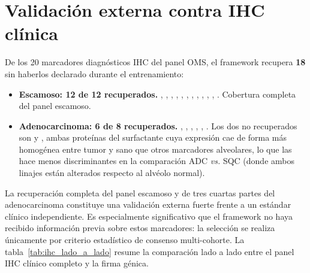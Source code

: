 \section{Validación externa contra IHC clínica}
\label{sec:res_ihc}

De los 20 marcadores diagnósticos IHC del panel OMS, el framework
recupera \textbf{18} sin haberlos declarado durante el entrenamiento:

\begin{itemize}
  \item \textbf{Escamoso: 12 de 12 recuperados.} , ,
  , , , , ,
  , , , , .
  Cobertura completa del panel escamoso.
  \item \textbf{Adenocarcinoma: 6 de 8 recuperados.} ,
  , , , ,
  . Los dos no recuperados son  y ,
  ambas proteínas del surfactante cuya expresión cae de forma más
  homogénea entre tumor y sano que otros marcadores alveolares, lo que las
  hace menos discriminantes en la comparación ADC \emph{vs.} SQC (donde
  ambos linajes están alterados respecto al alvéolo normal).
\end{itemize}

La recuperación completa del panel escamoso y de tres cuartas partes del
adenocarcinoma constituye una validación externa fuerte frente a un
estándar clínico independiente. Es especialmente significativo que el
framework no haya recibido información previa sobre estos marcadores: la
selección se realiza únicamente por criterio estadístico de consenso
multi-cohorte. La tabla~\ref{tab:ihc_lado_a_lado} resume la comparación
lado a lado entre el panel IHC clínico completo y la firma génica.

